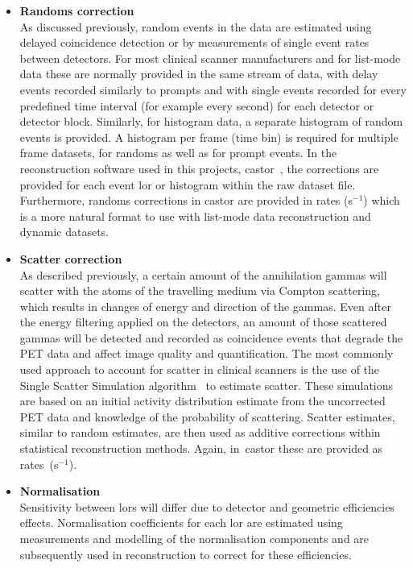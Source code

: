 \begin{itemize}
\item\textbf{Randoms correction}\\
As discussed previously, random events in the data are estimated using delayed coincidence detection or by measurements of single event rates between detectors. For most clinical scanner manufacturers and for list-mode data these are normally provided in the same stream of data, with delay events recorded similarly to prompts and with single events recorded for every predefined time interval (for example every second) for each detector or detector block. Similarly, for histogram data, a separate histogram of random events is provided. A histogram per frame (time bin) is required for multiple frame datasets, for randoms as well as for prompt events. 
In the reconstruction software used in this projects, \gls{castor}~\cite{Merlin2018}, the corrections are provided for each event \gls{lor} or histogram within the raw dataset file. Furthermore, randoms corrections in \gls{castor} are provided in rates (s$^{-1}$) which is a more natural format to use with list-mode data reconstruction and dynamic datasets.
\item\textbf{Scatter correction}\\
As described previously, a certain amount of the annihilation gammas will scatter with the atoms of the travelling medium via Compton scattering, which results in changes of energy and direction of the gammas. Even after the energy filtering applied on the detectors, an amount of those scattered gammas will be detected and recorded as coincidence events that degrade the PET data and affect image quality and quantification. The most commonly used approach to account for scatter in clinical scanners is the use of the Single Scatter Simulation algorithm~\cite{Watson1996} to estimate scatter. These simulations are based on an initial activity distribution estimate from the uncorrected PET data and knowledge of the probability of scattering. 
Scatter estimates, similar to random estimates, are then used as additive corrections within statistical reconstruction methods. Again, in~\gls{castor} these are provided as \mbox{rates (s$^{-1}$)}. 
\item\textbf{Normalisation}\\ 
Sensitivity between \glspl{lor} will differ due to detector and geometric efficiencies effects. Normalisation coefficients for each \gls{lor} are estimated using measurements and modelling of the normalisation components and are subsequently used in reconstruction to correct for these efficiencies.

\end{itemize}
